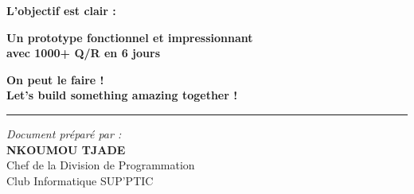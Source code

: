 \documentclass[11pt,a4paper]{article}
\begin{document}
\begin{center}
\Large
\textbf{L'objectif est clair :}

\vspace{0.5cm}

\textbf{Un prototype fonctionnel et impressionnant} \\
\textbf{avec 1000+ Q/R en 6 jours}

\vspace{1cm}

\textbf{ On peut le faire !} \\
\textbf{Let's build something amazing together !}

\vspace{2cm}

\rule{0.5\textwidth}{0.4pt}

\vfill

\normalsize
\textit{Document préparé par :} \\
\textbf{NKOUMOU TJADE} \\
Chef de la Division de Programmation \\
Club Informatique SUP'PTIC

\vspace{0.5cm}


\end{center}
\end{document}
